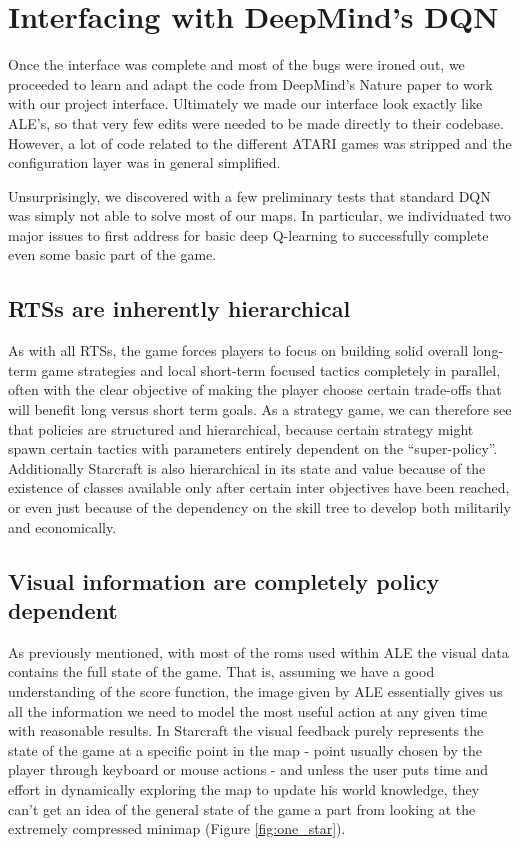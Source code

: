 \documentclass[bsc,frontabs,twoside,singlespacing,parskip,deptreport]{infthesis}     %
\begin{document}
\section{Interfacing with DeepMind's DQN}

Once the interface was complete and most of the bugs were ironed out, we
proceeded to learn and adapt the code from DeepMind's Nature paper to work with
our project interface. Ultimately we made our interface look exactly like ALE's,
so that very few edits were needed to be made directly to their codebase.
However, a lot of code related to the different ATARI games was stripped and the
configuration layer was in general simplified.

Unsurprisingly, we discovered with a few preliminary tests that standard DQN was
simply not able to solve most of our maps. In particular, we individuated two
major issues to first address for basic deep Q-learning to successfully complete
even some basic part of the game.

\subsection{RTSs are inherently hierarchical}

As with all RTSs, the game forces players to focus on building solid overall
long-term game strategies and local short-term focused tactics completely in
parallel, often with the clear objective of making the player choose certain
trade-offs that will benefit long versus short term goals. As a strategy game, we
can therefore see that policies are structured and hierarchical, because certain
strategy might spawn certain tactics with parameters entirely dependent on the
``super-policy''. Additionally Starcraft is also hierarchical in its state and
value because of the existence of classes available only after certain inter
objectives have been reached, or even just because of the dependency on the
skill tree to develop both militarily and economically.

\subsection{Visual information are completely policy dependent}

As previously mentioned, with most of the roms used within ALE the visual data
contains the full state of the game. That is, assuming we have a good
understanding of the score function, the image given by ALE essentially gives us
all the information we need to model the most useful action at any given time
with reasonable results. In Starcraft the visual feedback purely represents the
state of the game at a specific point in the map - point usually chosen by the
player through keyboard or mouse actions - and unless the user puts time and
effort in dynamically exploring the map to update his world knowledge, they
can't get an idea of the general state of the game a part from looking at the
extremely compressed minimap (Figure \ref{fig:one_star}).
\end{document}
